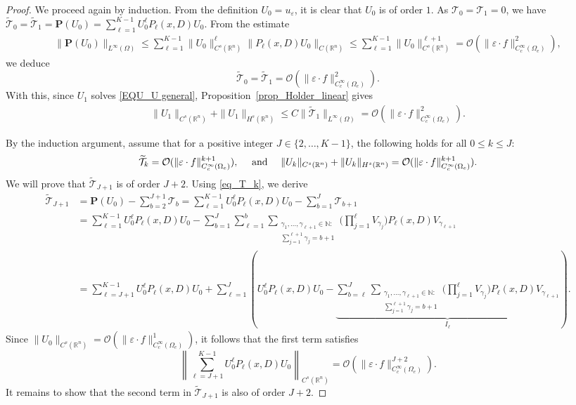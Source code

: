 \documentclass[10pt,a4paper]{amsart}
\newcommand{\R}{\mathbb{R}}
\begin{document}
\begin{proof}
We proceed again by induction. From the definition $U_0=u_\varepsilon$, it is clear that $U_0$ is of order $1$.
As $\mathcal{T}_0=\mathcal{T}_1=0$, we have $\widetilde{\mathcal{T}}_0=\widetilde{\mathcal{T}}_1=\mathbf{P}(U_0)=\sum_{\ell = 1}^{K-1}U_0^{\ell}P_\ell(x,D)U_0$.
From the estimate
\begin{align*}
\|\mathbf{P}(U_0)\|_{L^\infty(\Omega)}\leq \sum_{\ell = 1}^{K-1}\|U_0\|_{C^{s}(\R^n)}^{\ell}\|P_\ell(x,D)U_0\|_{C(\R^n)} \le \sum_{\ell = 1}^{K-1}\|U_0\|_{C^{s}(\R^n)}^{\ell+1} = \mathcal{O}(\|\varepsilon\cdot f\|^{2}_{C_c^\infty(\Omega_e)}),
\end{align*}	
we deduce
$$
\widetilde{\mathcal{T}}_0=\widetilde{\mathcal{T}}_1 = \mathcal{O}(\|\varepsilon\cdot f\|^{2}_{C_c^\infty(\Omega_e)}).
$$
With this, since $U_1$ solves \eqref{EQU_U general}, Proposition~\ref{prop_Holder_linear} gives
\begin{align}
\|U_1\|_{C^s(\R^n)}+ \|U_1\|_{H^s(\R^n)}
\le  C\|\widetilde{\mathcal{T}}_1 \|_{L^\infty(\Omega)}=\mathcal{O}(\|\varepsilon \cdot f\|^{2}_{C^\infty_c(\Omega_e)}).
\end{align}	


By the induction argument, assume that for a positive integer $J\in \{2,\ldots, K-1\}$, the following holds for all $0\leq k\leq J$:
$$
\widetilde {\mathcal{T}}_{k} =  \mathcal{O}(\|\varepsilon\cdot f\|^{k+1}_{C^\infty_c(\Omega_e)}),\quad \hbox{ and }\quad\| U_{k}\|_{C^{s}(\R^n)}+ \|U_k\|_{H^s(\R^n)} = \mathcal{O}(\|\varepsilon\cdot f\|^{k+1}_{C^\infty_c(\Omega_e)}).
$$
We will prove that $\widetilde {\mathcal{T}}_{J+1}$ is of order $J+2$. Using \eqref{eq_T_k}, we derive
\begin{align*}
\widetilde{\mathcal{T}}_{J+1} & = \mathbf{P}(U_0) - \sum_{b=2}^{J+1}\mathcal T_b = \sum_{\ell=1}^{K-1}U_0^\ell P_\ell (x,D)U_0 - \sum_{b=1}^{J}\mathcal T_{b+1}
\\ & =
\sum_{\ell=1}^{K-1}U_0^\ell P_\ell(x,D) U_0 - \sum_{b=1}^{J}\sum^{b}_{\ell=1} \sum_{\substack{ \gamma_1,\ldots, \gamma_{\ell+1}\in \mathbb{N}  : \\ \sum_{j=1}^{\ell+1}\gamma_j = b+1 }}  \bigg( \prod_{j=1}^\ell V_{\gamma_j} \bigg) P_\ell(x,D) V_{\gamma_{\ell+1}} 
\\ & =
\sum_{\ell = J+1}^{K-1}U_0^{\ell}P_\ell(x,D)U_0 +  \sum^{J}_{\ell=1} \left(U_0^ {\ell}P_\ell(x,D)U_0 - \underbrace{\sum_{b=\ell}^{J}\sum_{\substack{ \gamma_1,\ldots, \gamma_{\ell+1}\in \mathbb{N} : \\ \sum_{j=1}^{\ell+1}\gamma_j = b+1 }}  \bigg( \prod_{j=1}^\ell V_{\gamma_j} \bigg)    P_\ell(x,D)V_{\gamma_{\ell+1}} }_{I_\ell}\right).
\end{align*}	
Since $\|U_0\|_{C^s(\R^n)} =\mathcal{O}(\|\varepsilon\cdot f\|^{1}_{C_c^\infty(\Omega_e)})$, it follows that the first term satisfies 
\[
\left\| \sum_{\ell = J+1}^{K-1}U_0^{\ell}P_\ell(x,D)U_0 \right\|_{C^s(\R^n)} =\mathcal{O}(\|\varepsilon\cdot f\|^{J+2}_{C_c^\infty(\Omega_e)}). 
\]
It remains to show that the second term in $\widetilde{\mathcal{T}}_{J+1}$ is also of order $J+2$.


\end{proof}
\end{document}
